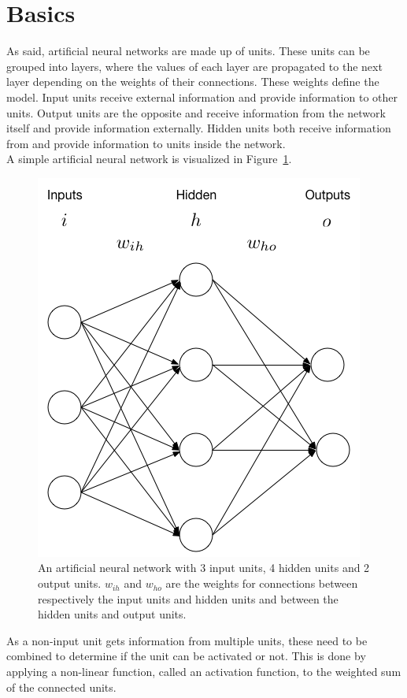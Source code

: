 \section{Basics} %
\label{sec:basics}
As said, artificial neural networks are made up of units. These units can be grouped into layers, where the values of each layer are propagated to the next layer depending on the weights of their connections. These weights define the model.
Input units receive external information and provide information to other units.
Output units are the opposite and receive information from the network itself and provide information externally.
Hidden units both receive information from and provide information to units inside the network.\\
A simple artificial neural network is visualized in Figure~\ref{fig:ann}.\\
\begin{figure}[htb]
    \centering
    \includegraphics[width=.7\linewidth]{images/ann.png}
    \caption[An artificial neural network]{An artificial neural network with 3 input units, 4 hidden units and 2 output units. $w_{ih}$ and $w_{ho}$ are the weights for connections between respectively the input units and hidden units and between the hidden units and output units.}
    \label{fig:ann}
\end{figure}
As a non-input unit gets information from multiple units, these need to be combined to determine if the unit can be activated or not.
This is done by applying a non-linear function, called an activation function, to the weighted sum of the connected units.

